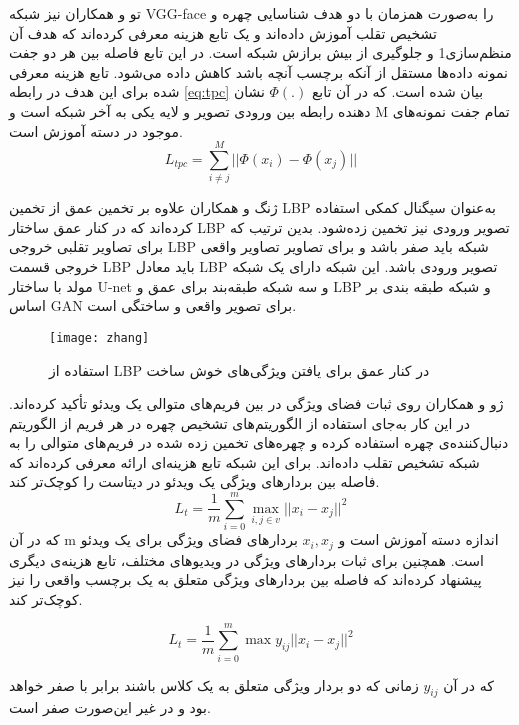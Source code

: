 تو و همکاران
\cite{tu2020learning}
 نیز شبکه VGG-face را به‌صورت همزمان با دو هدف شناسایی چهره و تشخیص تقلب آموزش داده‌اند و یک تابع هزینه معرفی کرده‌اند که هدف آن منظم‌سازی1 و جلوگیری از بیش برازش شبکه است. در این تابع فاصله بین هر دو جفت نمونه داده‌ها مستقل از آنکه برچسب آنچه باشد کاهش داده می‌شود. تابع هزینه معرفی شده برای این هدف در رابطه
\ref{eq:tpc}
 بیان شده است. که در آن تابع 
 $\Phi(.)$
  نشان دهنده رابطه بین ورودی تصویر و لایه یکی به آخر شبکه است و M تمام جفت نمونه‌های موجود در دسته آموزش است. 
  \begin{equation}\label{eq:tpc}
 	L_{tpc}=\sum_{i\ne j}^{M}||\Phi(x_i)-\Phi(x_j)||
 \end{equation}

ژنگ و همکاران
\cite{zhang2020face}
علاوه بر تخمین عمق از تخمین LBP به‌عنوان سیگنال کمکی استفاده کرده‌اند که در کنار عمق ساختار LBP تصویر ورودی نیز تخمین زده‌شود. بدین ترتیب که برای تصاویر تقلبی خروجی LBP شبکه باید صفر باشد و برای تصاویر تصاویر واقعی خروجی قسمت LBP باید معادل LBP تصویر ورودی باشد. این شبکه دارای یک شبکه مولد با ساختار U-net و سه شبکه طبقه‌بند برای عمق و LBP و شبکه طبقه بندی بر اساس GAN برای تصویر واقعی و ساختگی است.
 \begin{figure}[h]
	\centerline{\texttt{[image: zhang]}}
	\caption{استفاده از LBP در کنار عمق برای یافتن ویژگی‌های خوش ساخت \cite{zhang2020face} }
	\label{fig:zhang}
\end{figure}

ژو و همکاران
\cite{xu2021improving}
روی ثبات فضای ویژگی در بین فریم‌های متوالی یک ویدئو تأکید کرده‌اند. در این کار به‌جای استفاده از الگوریتم‌های تشخیص چهره در هر فریم از الگوریتم دنبال‌کننده‌ی چهره استفاده کرده و چهره‌های تخمین زده شده در فریم‌های متوالی را به شبکه تشخیص تقلب داده‌اند. برای این شبکه تابع هزینه‌ای ارائه معرفی کرده‌اند که فاصله بین بردارهای ویژگی یک ویدئو در دیتاست را کوچک‌تر کند. 
  \begin{equation}\label{eq:xult}
	L_{t}=\frac{1}{m}\sum_{i=0}^{m}\max_{i,j \in v}{||x_i-x_j||^2}
\end{equation}
که در آن m اندازه دسته آموزش است و
$x_i,x_j$
بردارهای فضای ویژگی برای یک ویدئو است. همچنین برای ثبات بردارهای ویژگی در ویدیوهای مختلف، تابع هزینه‌ی دیگری پیشنهاد کرده‌اند که فاصله بین بردارهای ویژگی متعلق به یک برچسب واقعی را نیز کوچک‌تر کند.

  \begin{equation}\label{eq:xule}
	L_{t}=\frac{1}{m}\sum_{i=0}^{m}\max{y_{ij}||x_i-x_j||^2}
\end{equation}

که در آن 
$y_{ij}$
  زمانی که دو بردار ویژگی متعلق به یک کلاس باشند برابر با صفر خواهد بود و در غیر این‌صورت صفر است.
